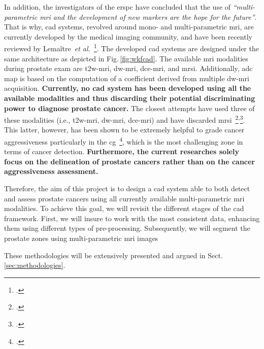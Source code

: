 In addition, the investigators of the \ac{erspc} have concluded that the use of \emph{``multi-parametric \ac{mri} and the development of new markers are the hope for the future''}.
That is why, \ac{cad} systems, revolved around mono- and multi-parametric \ac{mri}, are currently developed by the medical imaging community, and have been recently reviewed by Lema\^itre~\emph{et al.}~\footcite{Lemaitre2015}.
The developed \ac{cad} systems are designed under the same architecture as depicted in Fig.\,\ref{fig:wkfcad}. 
The available \ac{mri} modalities during prostate exam are \ac{t2w}-\ac{mri}, \ac{dw}-\ac{mri}, \ac{dce}-\ac{mri}, and \ac{mrsi}. 
Additionally, \ac{adc} map is based on the computation of a coefficient derived from multiple \ac{dw}-\ac{mri} acquisition.
\textbf{Currently, no \ac{cad} system has been developed using all the available modalities and thus discarding their potential discriminating power to diagnose prostate cancer.}
The closest attempts have used three of these modalities (i.e., \ac{t2w}-\ac{mri}, \ac{dw}-\ac{mri}, \ac{dce}-\ac{mri}) and have discarded \ac{mrsi}~\footcite{Litjens2014}\textsuperscript{,}\footcite{Viswanath2011}.
This latter, however, has been shown to be extremely helpful to grade cancer aggressiveness particularly in the \ac{cg}~\footcite{Vos2015}, which is the most challenging zone in terms of cancer detection.
\textbf{Furthermore, the current researches solely focus on the delineation of prostate cancers rather than on the cancer aggressiveness assessment.}



Therefore, the aim of this project is to design a \ac{cad} system able to both detect and assess prostate cancers using all currently available multi-parametric \ac{mri} modalities.
To achieve this goal, we will revisit the different stages of the \ac{cad} framework.
First, we will insure to work with the most consistent data, enhancing them using different types of pre-processing.
Subsequently, we will segment the prostate zones using multi-parametric \ac{mri} images 

These methodologies will be extensively presented and argued in Sect.\,\ref{sec:methodologies}.

